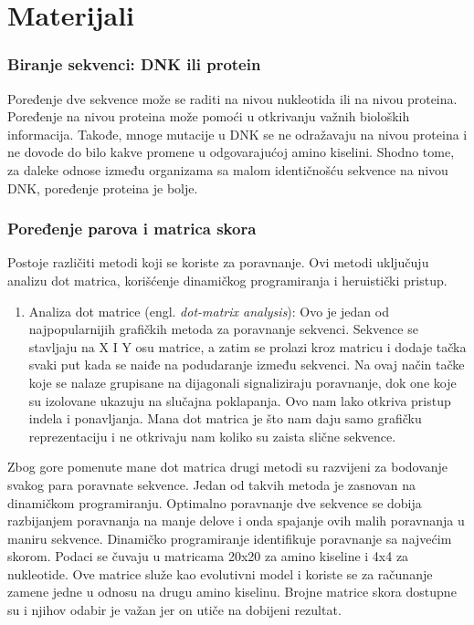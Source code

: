 \chapter{Materijali}

\subsection{Biranje sekvenci: DNK ili protein}
Poređenje dve sekvence može se raditi na nivou nukleotida ili na nivou proteina. Poređenje na nivou proteina može pomoći u otkrivanju važnih bioloških informacija. Takođe, mnoge mutacije u DNK se ne odražavaju na nivou proteina i ne dovode do bilo kakve promene u odgovarajućoj amino kiselini. Shodno tome, za daleke odnose između organizama sa malom identičnošću sekvence na nivou DNK, poređenje proteina je bolje.


\subsection{Poređenje parova i matrica skora}
Postoje različiti metodi koji se koriste za poravnanje. Ovi metodi uključuju analizu dot matrica, korišćenje dinamičkog programiranja i heruistički pristup.

\begin{enumerate}
\item Analiza dot matrice (engl. \textit{dot-matrix analysis}): Ovo je jedan od najpopularnijih grafičkih metoda za poravnanje sekvenci. Sekvence se stavljaju na X I Y osu matrice, a zatim se prolazi kroz matricu i dodaje tačka svaki put kada se naiđe na podudaranje između sekvenci. Na ovaj način tačke koje se nalaze grupisane na dijagonali signaliziraju poravnanje, dok one koje su izolovane ukazuju na slučajna poklapanja. Ovo nam lako otkriva pristup indela i ponavljanja. Mana dot matrica je što nam daju samo grafičku reprezentaciju i ne otkrivaju nam koliko su zaista slične sekvence.
\end{enumerate} \vspace{5mm}

Zbog gore pomenute mane dot matrica drugi metodi su razvijeni za bodovanje svakog para poravnate sekvence. Jedan od takvih metoda je zasnovan na dinamičkom programiranju. Optimalno poravnanje dve sekvence se dobija razbijanjem poravnanja na manje delove i onda spajanje ovih malih poravnanja u maniru sekvence. Dinamičko programiranje identifikuje poravnanje sa najvećim skorom. Podaci se čuvaju u matricama 20x20 za amino kiseline i 4x4 za nukleotide. Ove matrice služe kao evolutivni model i koriste se za računanje zamene jedne u odnosu na drugu amino kiselinu. Brojne matrice skora dostupne su i njihov odabir je važan jer on utiče na dobijeni rezultat.


